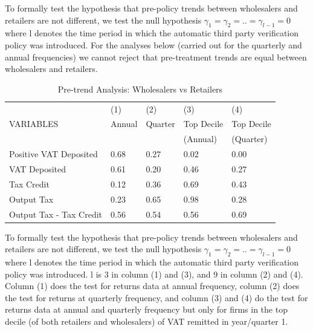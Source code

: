 To formally test the hypothesis that pre-policy trends between wholesalers and retailers are not different, we test the null hypothesis $\gamma_1=\gamma_2=..=\gamma_{l-1}=0$ where l denotes the time period in which the automatic third party verification policy was introduced. For the analyses below (carried out for the quarterly and annual frequencies) we cannot reject that pre-treatment trends are equal between wholesalers and retailers.  


\begin{table}[t!]
\footnotesize
\begin{threeparttable}
\begin{tabular}{lllll} \hline \hline
 & (1) & (2) & (3) & (4) \\
VARIABLES & Annual & Quarter & Top Decile &Top Decile  \\ 
 &  &  & (Annual) & (Quarter)  \\ \hline
Positive VAT Deposited & 0.68  & 0.27 & 0.02 &0.00 \\
VAT Deposited & 0.61 &  0.20 & 0.46 &0.27 \\
Tax Credit & 0.12 & 0.36 & 0.69 & 0.43 \\
Output Tax & 0.23 & 0.65 & 0.98 & 0.28 \\
Output Tax - Tax Credit & 0.56 & 0.54 & 0.56 & 0.69 \\ \hline
\end{tabular}
\begin{tablenotes}
To formally test the hypothesis that pre-policy trends between wholesalers and retailers are not different, we test the null hypothesis $\gamma_1=\gamma_2=..=\gamma_{l-1}=0$ where l denotes the time period in which the automatic third party verification policy was introduced. l is 3 in column (1) and (3), and 9 in column (2) and (4). Column (1) does the test for returns data at annual frequency, column (2) does the test for returns at quarterly frequency, and column (3) and (4) do the test for returns data at annual and quarterly frequency but only for firms in the top decile (of both retailers and wholesalers) of VAT remitted in year/quarter 1.
\end{tablenotes}
\caption{Pre-trend Analysis: Wholesalers vs Retailers}
\label{tbl:}
\end{threeparttable}
\end{table}


